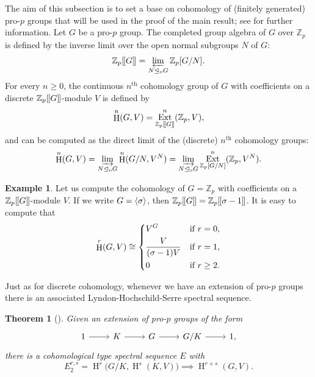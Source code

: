 \documentclass[11pt]{article}
\newcommand{\Zp}{\mathbb{Z}_p}
\DeclareMathOperator{\HH}{H}
\DeclareMathOperator{\Ext}{Ext}
\newcommand{\isom}{\cong}
\newcommand{\normaleq}{\unlhd}
\newcommand{\dirlim}{\varinjlim}
\newcommand{\invlim}{\varprojlim}
\DeclarePairedDelimiter{\gen}{\langle}{\rangle}
\DeclarePairedDelimiter{\dbrack}{[\mkern-1.5mu[}{]\mkern-1.5mu]}
\theoremstyle{plain}
\newtheorem{theorem}[lemma]{Theorem}
\theoremstyle{definition}
\newtheorem{example}[lemma]{Example}
\begin{document}
	The aim of this subsection is to set a base on cohomology of (finitely generated) pro-$p$ groups that will be used in the proof of the main result; see \cite[Chapter 6]{ribeszalesskii13} for further information. Let $G$ be a pro-$p$ group. The completed group algebra of $G$ over $\Zp$ is defined by the inverse limit over the open normal subgroups $N$ of $G$:
	$$
	\Zp\dbrack{G}=\invlim_{N\normaleq_o G}\Zp[G/N].
	$$ 
	For every $n\geq 0$, the continuous $n^{\text{th}}$ cohomology group of $G$ with coefficients on a discrete $\Zp\dbrack{G}$-module $V$ is defined by
\begin{displaymath}
	\HH^n(G,V)=\Ext_{\Zp\dbrack{G}}^n(\Zp,V),
\end{displaymath}
and can be computed as the direct limit of the (discrete) $n^{\text{th}}$ cohomology groups: 
\begin{displaymath}
	\HH^n(G,V)=\dirlim_{N\normaleq_o G}\HH^n(G/N,V^N)=\dirlim_{N\normaleq_o G}\Ext_{\Zp[G/N]}^n (\Zp,V^N).
\end{displaymath}

\begin{example}\label{ex: GroupDimOne}
	Let us compute the cohomology of $G=\Zp$ with coefficients on a $\Zp\dbrack{G}$-module $V$. If we write $G=\gen{\sigma}$, then $\Zp\dbrack{G}=\Zp\dbrack{\sigma-1}$. It is easy to compute that 
	\begin{displaymath}
		\HH^r(G,V)\isom \begin{dcases}
			V^{G} & \text{if } r=0, \\
			\frac{V}{(\sigma-1)V} & \text{if } r=1, \\
			0 & \text{if } r\geq 2. \\
		\end{dcases}
	\end{displaymath}
\end{example}

Just as for discrete cohomology, whenever we have an extension of pro-$p$ groups there is an associated Lyndon-Hochschild-Serre spectral sequence.
\begin{theorem}[{\cite[Theorem 7.2.4]{ribeszalesskii13}}]
	Given an extension of pro-$p$ groups of the form
	\[\begin{tikzcd}
		1 \rar & K \rar & G \rar & G/K \rar &  1,
	\end{tikzcd}\]
	 there is a cohomological type spectral sequence $E$ with 
	\begin{displaymath}
		E_2^{r,s}=\HH^r\big(G/K,\HH^s(K,V)\big) \implies \HH^{r+s}(G,V).
	\end{displaymath}
\end{theorem}
\end{document}
